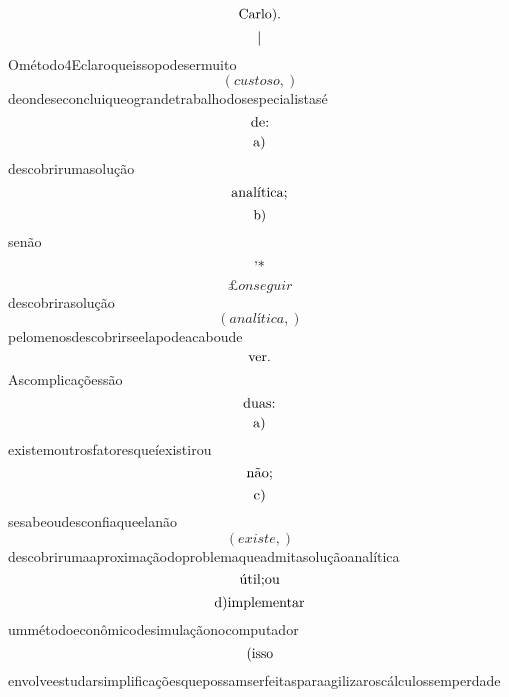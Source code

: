 \documentclass{article}
\begin{document}
\begin{equation}
$Carlo).$
\end{equation}\begin{equation}
$|$
\end{equation}Ométodo4Eclaroqueissopodesermuito\begin{equation}
\left( custoso,\right)
\end{equation}deondeseconcluiqueograndetrabalhodosespecialistasé\begin{equation}
$de:$
\end{equation}\begin{equation}
$a)$
\end{equation}descobrirumasolução\begin{equation}
$analítica;$
\end{equation}\begin{equation}
$b)$
\end{equation}senão\begin{equation}
$'*$
\end{equation}\begin{equation}
£onseguir
\end{equation}descobrirasolução\begin{equation}
\left( analítica,\right)
\end{equation}pelomenosdescobrirseelapodeacaboude\begin{equation}
$ver.$
\end{equation}Ascomplicaçõessão\begin{equation}
$duas:$
\end{equation}\begin{equation}
$a)$
\end{equation}existemoutrosfatoresqueíexistirou\begin{equation}
$não;$
\end{equation}\begin{equation}
$c)$
\end{equation}sesabeoudesconfiaqueelanão\begin{equation}
\left( existe,\right)
\end{equation}descobrirumaaproximaçãodoproblemaqueadmitasoluçãoanalítica\begin{equation}
$útil;ou$
\end{equation}\begin{equation}
$d)implementar$
\end{equation}ummétodoeconômicodesimulaçãonocomputador\begin{equation}
$(isso$
\end{equation}envolveestudarsimplificaçõesquepossamserfeitasparaagilizaroscálculossemperdade\begin{equation}

\end{equation}
\end{document}

